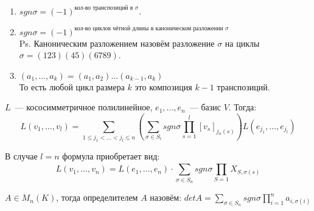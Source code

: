 \begin{follow}\leavevmode
    \begin{enumerate}
        \item
            $sgn\sigma = (-1)^{\text{кол-во транспозиций в $\sigma$}}$.
        \item
            $sgn\sigma = (-1)^{\text{кол-во циклов чётной длины в каноническом разложении $\sigma$}}$\\
            Ps. Каноническим разложением назовём разложение $\sigma$ на циклы 
            $\sigma =(123)(45)(6789)$.
        \item
            $(a_1,\dots, a_k) = (a_1,a_2)\dots(a_{k-1},a_k)$\\
            То есть любой цикл размера $k$ это композиция $k-1$ транспозиций.
    \end{enumerate}
\end{follow}
\begin{statement}
    $L$~--- кососимметричное полилинейное, $e_1,\dots,e_n$~--- базис $V$. Тогда:
    \[
        L(v_1,\dots, v_l) = \sum\limits_{1\le j_1<\dots<j_l\le n}{
    \left(\sum\limits_{\sigma\in S_l}{sgn\sigma \prod\limits_{s=1}^{l}{[v_s]_{j_\sigma(s)}}}\right)L(e_{j_1},\dots,e_{j_l})
        }
    \]
\end{statement}
\begin{remark}
    В случае $l = n$ формула приобретает вид:
    \[
        L(v_1,\dots, v_n) = L(e_1,\dots, e_n)\cdot \sum\limits_{\sigma\in S_n}^{}{
            sgn\sigma\prod_{S = 1}{X_{S,\sigma(s)}}
        }
    \]
\end{remark}
\begin{definition}
    $A\in M_n(K)$, тогда определителем $A$ назовём: $detA = \sum\limits_{\sigma\in S_n}
    {sgn\sigma \prod\limits_{i = 1}^{n}{a_{i, \sigma(i)}}}$
\end{definition}
